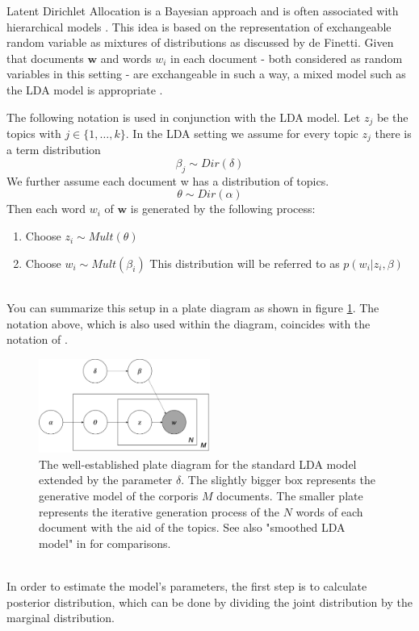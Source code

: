 \documentclass[11pt,a4paper]{article}
\begin{document}
Latent Dirichlet Allocation is a Bayesian approach and is often associated with hierarchical models \cite{Gelman2014}. This idea is based on the representation of exchangeable random variable as mixtures of distributions as discussed by de Finetti.  Given that documents $\textbf{w}$ and words $w_i$ in each document - both considered as random variables in this setting - are exchangeable in such a way, a mixed model such as the LDA model is appropriate \cite{Blei2003}.

The following notation is used in conjunction with the LDA model. Let $z_j$ be the topics with $j\in\{1,\dots,k\}$. In the LDA setting we assume for  every topic $z_j$ there is a term distribution
$$\beta_j \sim Dir(\delta)$$
We further assume each document w has a distribution of topics.
$$\theta \sim Dir(\alpha)$$
Then each word $w_i$ of $\textbf{w}$ is generated by the following process:

\begin{enumerate}
	\item Choose $z_i \sim Mult(\theta)$
	
	\item Choose $w_i \sim Mult(\beta_i)$ This distribution will be referred to as $p(w_i|z_i,\beta)$
\end{enumerate}
\ \\
You can summarize this setup in a plate diagram as shown in figure \ref{fig:PlateDiagram}. The notation above, which is also used within the diagram, coincides with the notation of \cite{Hornik2011}.\\


\begin{figure}[h]
	\centering
	\includegraphics[width=0.5\textwidth]{LDA_Plate_Diagram.png}
	\caption{The well-established plate diagram for the standard LDA model extended by the parameter $\delta$. The slightly bigger box represents the generative model of the corporis $M$ documents. The smaller plate represents the iterative generation process of the $N$ words of each document with the aid of the topics. See also "smoothed LDA model" in \cite{Blei2003}  for comparisons.}
	\label{fig:PlateDiagram}
\end{figure}
\ \\
In order to estimate the model's parameters, the first step is to calculate posterior distribution, which can be done by dividing the joint distribution by the marginal distribution.
\end{document}
